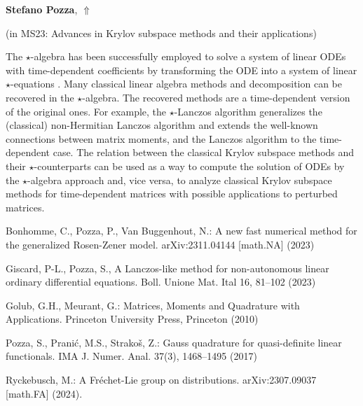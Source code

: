 \documentclass[ILAS2025-program.tex]{subfiles}
\begin{document}
     \hypertarget{down0194}{}\begin{ilasabstract}
    
    \textbf{Stefano Pozza},  \hfill \hyperlink{up0194}{$\Uparrow$}
    
    (in {\color{mstitle}MS23: Advances in Krylov subspace methods and their applications})
        
        \mtskip
    \begin{bibunit}
        The $\star$-algebra \cite{Man24} has been successfully employed to solve a system of linear ODEs with time-dependent coefficients by transforming the ODE into a system of linear $\star$-equations \cite{BonPozVan23,GisPoz}. Many classical linear algebra methods and decomposition can be recovered in the $\star$-algebra. The recovered methods are a time-dependent version of the original ones. For example, the $\star$-Lanczos algorithm \cite{GisPoz} generalizes the (classical) non-Hermitian Lanczos algorithm and extends the well-known connections between matrix moments, and the Lanczos algorithm \cite{GolMeu,PozPraStr} to the time-dependent case.
The relation between the classical Krylov subspace methods and their $\star$-counterparts can be used as a way to compute the solution of ODEs by the $\star$-algebra approach and, vice versa, to analyze classical Krylov subspace methods for time-dependent matrices with possible applications to perturbed matrices.

\begin{thebibliography}{99}
Bonhomme, C., Pozza, P., Van Buggenhout, N.:
A new fast numerical method for the generalized Rosen-Zener model. arXiv:2311.04144 [math.NA] (2023)

Giscard, P-L., Pozza, S., A Lanczos-like method for non-autonomous linear ordinary differential equations. Boll. Unione Mat. Ital 16, 81--102 (2023)

Golub, G.H., Meurant, G.: Matrices, Moments and Quadrature with Applications. Princeton University Press, Princeton (2010)

Pozza, S., Prani\'c, M.S., Strako\v s, Z.: Gauss quadrature for quasi-definite linear functionals. IMA J. Numer. Anal. 37(3), 1468--1495 (2017)

Ryckebusch, M.: A Fr\'echet-Lie group on distributions. arXiv:2307.09037 [math.FA] (2024).

\end{thebibliography}
        \end{bibunit}
        \end{ilasabstract}
\end{document}
